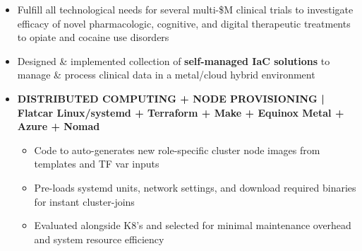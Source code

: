 \documentclass[10pt,a4paper,ragged2e]{altacv}
\begin{document}
\begin{fullwidth}
\makecvheader



\begin{itemize}[label={}]
    \item Fulfill all technological needs for several multi-\$M clinical trials to investigate efficacy of novel pharmacologic, cognitive, and digital therapeutic treatments to opiate and cocaine use disorders
    \item Designed \& implemented collection of \textbf{self-managed IaC solutions} to manage \& process clinical data in a metal/cloud hybrid environment
    \item\textbf{DISTRIBUTED COMPUTING + NODE PROVISIONING | Flatcar Linux/systemd + Terraform + Make + Equinox Metal + Azure + Nomad } 
    \begin{itemize}[label=-, noitemsep]
        \item Code to auto-generates new role-specific cluster node images from templates and TF var inputs
        \item Pre-loads systemd units, network settings, and download required binaries for instant cluster-joins 
        \item Evaluated alongside K8's and selected for minimal maintenance overhead and system resource efficiency
    \end{itemize}
    

\end{itemize}
\end{fullwidth}
\end{document}
